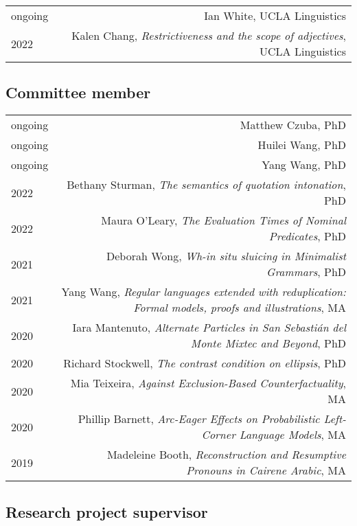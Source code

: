 \documentclass[12pt]{article}
\begin{document}
\begin{longtable}{LR}
  ongoing & Ian White, UCLA Linguistics
  \\
  2022    & Kalen Chang, \textit{Restrictiveness and the scope of adjectives},
            UCLA Linguistics
\end{longtable}

\subsection*{Committee member}

\begin{longtable}{LR}
  ongoing & Matthew Czuba, PhD\\
  ongoing & Huilei Wang, PhD\\
  ongoing & Yang Wang, PhD\\
  2022    & Bethany Sturman, \textit{The semantics of quotation intonation},
            PhD\\
  2022    & Maura O'Leary, \textit{The Evaluation Times of Nominal Predicates},
            PhD\\
  2021    & Deborah Wong, \textit{Wh-in situ sluicing in Minimalist Grammars},
            PhD\\
  2021    & Yang Wang, \textit{Regular languages extended with reduplication:
            Formal models, proofs and illustrations}, MA\\
  2020    & Iara Mantenuto, \textit{Alternate Particles in San Sebasti\'{a}n del
            Monte Mixtec and Beyond}, PhD\\
  2020    & Richard Stockwell, \textit{The contrast condition on ellipsis},
            PhD\\
  2020    & Mia Teixeira, \textit{Against Exclusion-Based Counterfactuality},
            MA\\
  2020    & Phillip Barnett, \textit{Arc-Eager Effects on Probabilistic
            Left-Corner Language Models}, MA\\
  2019    & Madeleine Booth, \textit{Reconstruction and Resumptive Pronouns in
            Cairene Arabic}, MA
\end{longtable}

\subsection*{Research project supervisor}
\end{document}
